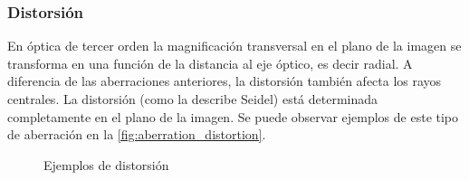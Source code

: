 \subsubsection{Distorsión}
En óptica de tercer orden la magnificación transversal en el plano de la imagen se transforma en una función de la distancia al eje óptico, es decir radial. A diferencia de las aberraciones anteriores, la distorsión también afecta los rayos centrales. La distorsión (como la describe Seidel) está determinada completamente en el plano de la imagen.
Se puede observar ejemplos de este tipo de aberración en la \autoref{fig:aberration_distortion}.
\begin{figure}[bth]
    \myfloatalign
        \myfloatalign
        \quad \quad \quad
        \caption[Distorsión]{Ejemplos de distorsión}\label{fig:aberration_distortion}
\end{figure}

